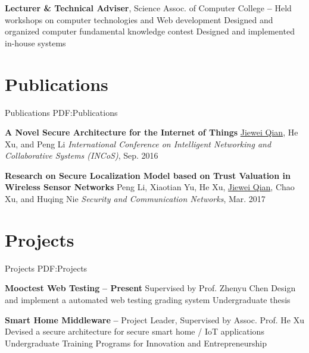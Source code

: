 \documentclass[a4paper,MMMyyyy,nonstop]{simpleresumecv}
\begin{document}
\begin{body}
\GapNoBreak

\textbf{Lecturer \& Technical Adviser}, Science Assoc. of Computer College
\hfill \textbf{
     -- 
}
\SubItem
Held workshops on computer technologies and Web development
\SubItem
Designed and organized computer fundamental knowledge contest
\SubItem
Designed and implemented in-house systems


\section
{Publications}
{Publications}
{PDF:Publications}

\textbf{A Novel Secure Architecture for the Internet of Things} \newline
\underline{Jiewei Qian}, He Xu, and Peng Li \newline
\textit{International Conference on Intelligent Networking and Collaborative Systems (INCoS)}, Sep. 2016

\Gap
\textbf{Research on Secure Localization Model based on Trust Valuation in Wireless Sensor Networks} \newline
Peng Li, Xiaotian Yu, He Xu, \underline{Jiewei Qian}, Chao Xu, and Huqing Nie\newline
\textit{Security and Communication Networks}, Mar. 2017


\section
{Projects}
{Projects}
{PDF:Projects}

\textbf{Mooctest Web Testing}
\hfill \textbf{  -- Present }
\SubItem
Supervised by Prof. Zhenyu Chen
\SubItem
Design and implement a automated web testing grading system
\SubItem
Undergraduate thesis

\GapNoBreak

\textbf{Smart Home Middleware}
\hfill \textbf{  --  }
\SubItem
Project Leader, Supervised by Assoc. Prof. He Xu
\SubItem
Devised a secure architecture for secure smart home / IoT applications
\SubItem
Undergraduate Training Programs for Innovation and Entrepreneurship



\end{body}
\end{document}
